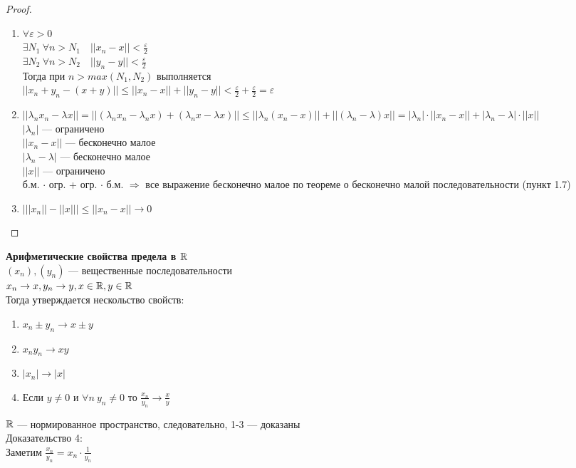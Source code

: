 \begin{proof} $ $
\begin{enumerate}
\item $\forall \varepsilon > 0$\\
$\exists N_1 \ \forall n > N_1 \quad ||x_n - x|| < \frac{\varepsilon}{2}$\\
$\exists N_2 \ \forall n > N_2 \quad ||y_n - y|| < \frac{\varepsilon}{2}$\\
Тогда при $n > max(N_1, N_2)$ выполняется\\
$||x_n + y_n - (x + y)|| \leq ||x_n - x|| + ||y_n - y|| < \frac{\varepsilon}{2} + \frac{\varepsilon}{2} = \varepsilon$
\item $||\lambda_n x_n - \lambda x|| = ||(\lambda_n x_n - \lambda_n x) + (\lambda_n x - \lambda x)|| \leq ||\lambda_n (x_n - x)|| + ||(\lambda_n - \lambda) x|| = |\lambda_n|\cdot ||x_n - x|| + |\lambda_n - \lambda|\cdot ||x||$\\
$|\lambda_n|$ --- ограничено\\
$||x_n - x||$ --- бесконечно малое\\
$|\lambda_n - \lambda|$ --- бесконечно малое\\
$||x||$ --- ограничено\\
б.м. $\cdot$ огр. + огр. $\cdot$ б.м. $\Rightarrow$ все выражение бесконечно малое по теореме о бесконечно малой последовательности (пункт 1.7)
\item $\Big|||x_n|| - ||x||\Big| \leq ||x_n - x|| \rightarrow 0$
\end{enumerate}
\end{proof}
\textbf{Арифметические свойства предела в $\operatorname*{\mathbb{R}}$}\\
$(x_n), (y_n)$ --- вещественные последовательности\\
$x_n\rightarrow x, y_n\rightarrow y, x \in \operatorname*{\mathbb{R}}, y \in \operatorname*{\mathbb{R}}$\\
Тогда утверждается нескольство свойств:
\begin{enumerate}
\item $x_n \pm y_n \rightarrow x \pm y$
\item $x_n y_n \rightarrow x y$
\item $|x_n| \rightarrow |x|$
\item Если $y \neq 0$ и $\forall n \ y_n \neq 0$ то $\frac{x_n}{y_n} \rightarrow \frac{x}{y}$
\end{enumerate}
$\operatorname*{\mathbb{R}}$ --- нормированное пространство, следовательно, 1-3 --- доказаны\\
Доказательство 4:\\
Заметим $\frac{x_n}{y_n} = x_n \cdot \frac{1}{y_n}$\\
